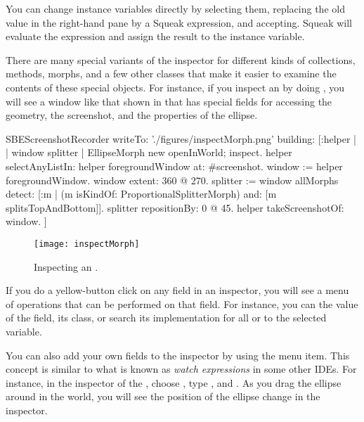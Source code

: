 \documentclass[a4paper,10pt,twoside]{book}
\begin{document}
You can change instance variables directly by selecting them, replacing the old value in the right-hand pane by a Squeak expression, and accepting.
Squeak will evaluate the expression and assign the result to the instance variable.

There are many special variants of the inspector for different kinds of collections, methods, morphs, and a few other classes that make it easier to examine the contents of these special objects.
For instance, if you inspect an  by doing , you will see a window like that shown in  that has special fields for accessing the geometry, the screenshot, and the properties of the ellipse.

\begin{ExecuteSmalltalkScript}
SBEScreenshotRecorder writeTo: './figures/inspectMorph.png' building: [:helper | | window splitter |
	EllipseMorph new openInWorld; inspect.
	helper selectAnyListIn: helper foregroundWindow at: #screenshot.
	window := helper foregroundWindow.
	window extent: 360 @ 270.
	splitter := window allMorphs detect: [:m |
		(m isKindOf: ProportionalSplitterMorph) and: [m splitsTopAndBottom]].
	splitter repositionBy: 0 @ 45.
	helper takeScreenshotOf: window.
]
\end{ExecuteSmalltalkScript}

\begin{figure}[btp]
	\begin{center}
		\texttt{[image: inspectMorph]}
	\end{center}
	\caption{Inspecting an .}
	\label{fig:inspectMorph}
\end{figure}

If you do a yellow-button click on any field in an inspector, you will see a menu of operations that can be performed on that field.
For instance, you can  the value of the field,  its class, or search its implementation for all  or  to the selected variable.

You can also add your own fields to the inspector by using the  menu item.
This concept is similar to what is known as \emph{watch expressions} in some other IDEs.
For instance, in the inspector of the , choose , type , and .
As you drag the ellipse around in the world, you will see the position of the ellipse change in the inspector.
\end{document}
